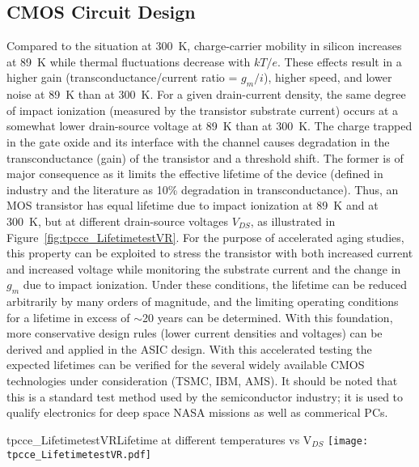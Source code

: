 \subsection{CMOS Circuit Design}
\label{subsec:fe_CMOS}

Compared to the situation at 300~K, charge-carrier mobility in silicon increases at 89~K
while thermal fluctuations decrease with $kT/e$.
These effects result in a higher gain (transconductance/current ratio = $g_{m}/ i$), higher speed, and lower noise
at 89~K than at 300~K.
For a given drain-current density, the same degree of impact ionization (measured by the transistor substrate current)
occurs at a somewhat lower drain-source voltage at 89~K than at 300~K.
The charge trapped in the gate oxide and its interface with the channel causes degradation in the transconductance (gain)
of the transistor and a threshold shift.
The former is of major consequence as it limits the effective lifetime of the device
(defined in industry and the literature as 10\% degradation in transconductance).
Thus, an MOS transistor has equal lifetime due to impact ionization at 89~K and at 300~K,
but at different drain-source voltages $V_{DS}$,
as illustrated in Figure~\ref{fig:tpcce_LifetimetestVR}.  
For the purpose of accelerated aging studies, this property can be exploited to stress the transistor with both increased current
and increased voltage while monitoring the substrate current and the change in $g_{m}$ due to impact ionization.
Under these conditions, the lifetime can be reduced arbitrarily by many orders of magnitude,
and the limiting operating conditions for a lifetime in excess of $\sim$20 years can be determined.
With this foundation, more conservative design rules (lower current densities and voltages)
can be derived and applied in the ASIC design.
With this accelerated testing the expected lifetimes can be verified for the several
widely available CMOS technologies under consideration (TSMC, IBM, AMS).
It should be noted that this is a standard test method used by the semiconductor industry;
it is used to qualify electronics for deep space NASA missions as well as commerical PCs.
 
\begin{cdrfigure}{tpcce_LifetimetestVR}{Lifetime at different temperatures vs V$_{DS}$}
\texttt{[image: tpcce\_LifetimetestVR.pdf]}
\end{cdrfigure}

